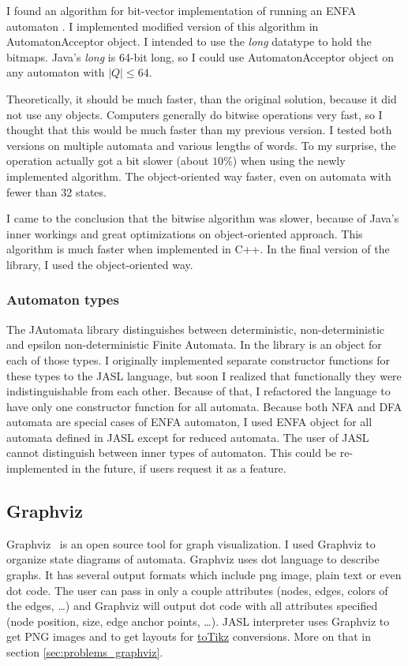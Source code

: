 \documentclass{ctuthesis}
\begin{document}
I found an algorithm for bit-vector implementation of running an ENFA automaton \cite{acceptor-algorithm}. I implemented modified version of this algorithm in AutomatonAcceptor object. I intended to use the \textit{long} datatype to hold the bitmaps. Java's \textit{long} is 64-bit long, so I could use AutomatonAcceptor object on any automaton with $|Q| \leq 64$. 

Theoretically, it should be much faster, than the original solution, because it did not use any objects. Computers generally do bitwise operations very fast, so I thought that this would be much faster than my previous version. I tested both versions on multiple automata and various lengths of words. To my surprise, the operation actually got a bit slower (about $10\%$) when using the newly implemented algorithm. The object-oriented way faster, even on automata with fewer than 32 states. 

I came to the conclusion that the bitwise algorithm was slower, because of Java's inner workings and great optimizations on object-oriented approach. This algorithm is much faster when implemented in C++. In the final version of the library, I used the object-oriented way.

\subsubsection{Automaton types}
The JAutomata library distinguishes between deterministic, non-deterministic and epsilon non-deterministic Finite Automata. In the library is an object for each of those types. I originally implemented separate constructor functions for these types to the JASL language, but soon I realized that functionally they were indistinguishable from each other. Because of that, I refactored the language to have only one constructor function for all automata. Because both NFA and DFA automata are special cases of ENFA automaton, I used ENFA object for all automata defined in JASL except for reduced automata. The user of JASL cannot distinguish between inner types of automaton. This could be re-implemented in the future, if users request it as a feature.

\subsection{Graphviz}

Graphviz~\cite{graphviz} is an open source tool for graph visualization. I used Graphviz to organize state diagrams of automata. Graphviz uses dot language to describe graphs. It has several output formats which include png image, plain text or even dot code. The user can pass in only a couple attributes (nodes, edges, colors of the edges, \ldots) and Graphviz will output dot code with all attributes specified (node position, size, edge anchor points, \ldots). JASL interpreter uses Graphviz to get PNG images and to get layouts for \hyperref[to-tikz-conversion]{toTikz} conversions. More on that in section \ref{sec:problems_graphviz}.
\end{document}
